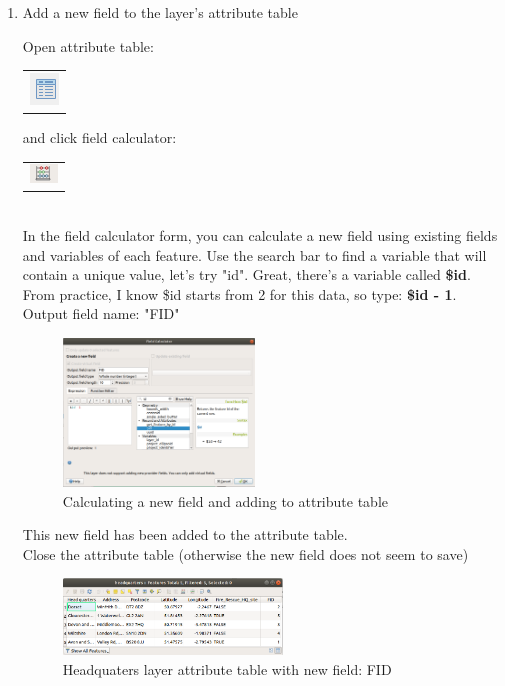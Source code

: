 \begin{enumerate}[~~~1)]
	\item Add a new field to the layer’s attribute table

Open attribute table:
\begin{tabular}{@{}c@{}}\includegraphics[width=4ex]{images/attribute_table_icon.png}\end{tabular} and click field calculator: 
\begin{tabular}{@{}c@{}}\includegraphics[width=4ex]{images/open_field_calculater_icon.png}\end{tabular}\\

In the field calculator form, you can calculate a new field using existing fields and variables of each feature. Use the search bar to find a variable that will contain a unique value, let's try "id". Great, there's a variable called \textbf{\$id}. From practice, I know \$id starts from 2 for this data, so type: \textbf{\$id - 1}.\\
Output field name: "FID"

\begin{figure}[!h]
	\centering
	\includegraphics[width=0.48\textwidth]{images/field_calculator_form.png}
	\caption{Calculating a new field and adding to attribute table}
	\label{ft_fig_firstfig3}
\end{figure}

This new field has been added to the attribute table.\\
Close the attribute table (otherwise the new field does not seem to save)

\begin{figure}[!h]
	\centering
	\includegraphics[width=0.55\textwidth]{images/headquarters_attribute_table.png}
	\caption{Headquaters layer attribute table with new field: FID}
	\label{ft_fig_firstfig3}
\end{figure}


\end{enumerate}
